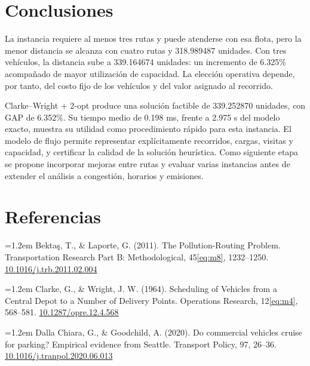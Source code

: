 \documentclass[11pt,a4paper]{article}
\numberwithin{equation}{section}
\begin{document}
\Needspace{110pt}

\section{Conclusiones}

La instancia requiere al menos tres rutas y puede atenderse con esa flota, pero la menor distancia se alcanza con cuatro rutas y 318.989487 unidades. Con tres vehículos, la distancia sube a 339.164674 unidades: un incremento de 6.325\% acompañado de mayor utilización de capacidad. La elección operativa depende, por tanto, del costo fijo de los vehículos y del valor asignado al recorrido.


Clarke--Wright + 2-opt produce una solución factible de 339.252870 unidades, con GAP de 6.352\%. Su tiempo medio de 0.198 ms, frente a 2.975 s del modelo exacto, muestra su utilidad como procedimiento rápido para esta instancia. El modelo de flujo permite representar explícitamente recorridos, cargas, visitas y capacidad, y certificar la calidad de la solución heurística. Como siguiente etapa se propone incorporar mejoras entre rutas y evaluar varias instancias antes de extender el análisis a congestión, horarios y emisiones.


\clearpage

\section*{Referencias}

{\small\hangindent=1.2em Bekta\c{s}, T., \& Laporte, G. (2011). The Pollution-Routing Problem. Transportation Research Part B: Methodological, 45\eqref{eq:m8}, 1232--1250. \href{https://doi.org/10.1016/j.trb.2011.02.004}{10.1016/j.trb.2011.02.004}\par}

{\small\hangindent=1.2em Clarke, G., \& Wright, J. W. (1964). Scheduling of Vehicles from a Central Depot to a Number of Delivery Points. Operations Research, 12\eqref{eq:m4}, 568--581. \href{https://doi.org/10.1287/opre.12.4.568}{10.1287/opre.12.4.568}\par}

{\small\hangindent=1.2em Dalla Chiara, G., \& Goodchild, A. (2020). Do commercial vehicles cruise for parking? Empirical evidence from Seattle. Transport Policy, 97, 26--36. \href{https://doi.org/10.1016/j.tranpol.2020.06.013}{10.1016/j.tranpol.2020.06.013}\par}
\end{document}
